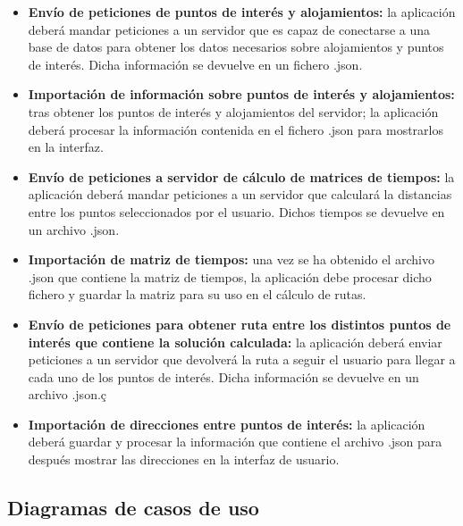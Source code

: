 \begin{itemize}
	\item \textbf{Envío de peticiones de puntos de interés y alojamientos:} la aplicación deberá mandar peticiones a un servidor que es capaz de conectarse a una base de datos para obtener los datos necesarios sobre alojamientos y puntos de interés. Dicha información se devuelve en un fichero .json.
	\item \textbf{Importación de información sobre puntos de interés y alojamientos:} tras obtener los puntos de interés y alojamientos del servidor; la aplicación deberá procesar la información contenida en el fichero .json para mostrarlos en la interfaz.
	\item \textbf{Envío de peticiones a servidor de cálculo de matrices de tiempos:} la aplicación deberá mandar peticiones a un servidor que calculará la distancias entre los puntos seleccionados por el usuario. Dichos tiempos se devuelve en un archivo .json.
	\item \textbf{Importación de matriz de tiempos:} una vez se ha obtenido el archivo .json que contiene la matriz de tiempos, la aplicación debe procesar dicho fichero y guardar la matriz para su uso en el cálculo de rutas.
	\item \textbf{Envío de peticiones para obtener ruta entre los distintos puntos de interés que contiene la solución calculada:} la aplicación deberá enviar peticiones a un servidor que devolverá la ruta a seguir el usuario para llegar a cada uno de los puntos de interés. Dicha información se devuelve en un archivo .json.ç
	
	\item \textbf{Importación de direcciones entre puntos de interés:} la aplicación deberá guardar y procesar la información que contiene el archivo .json para después mostrar las direcciones en la interfaz de usuario.
\end{itemize}

\subsection[Casos de uso]{Diagramas de casos de uso}
